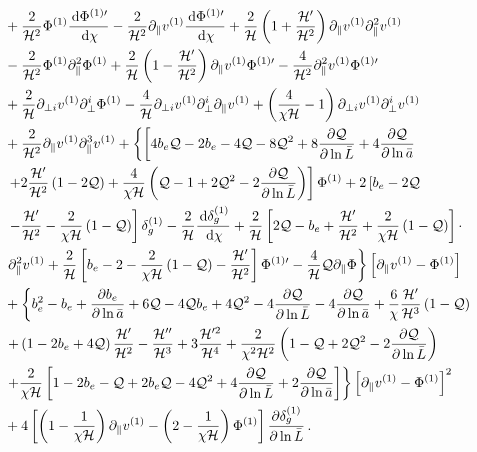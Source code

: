 \begin{align}
& + \frac{2}{\mathcal{H}^2} \Phi^{(1)} \frac{\,\mathrm{d} \Phi^{{(1)}\prime} }{\,\mathrm{d} \chi} - \frac{2}{\mathcal{H}^2} \partial_\| v^{(1)} \frac{\,\mathrm{d} \Phi^{{(1)} \prime} }{\,\mathrm{d} \chi} + \frac{2}{\mathcal{H}} \left(1 +\frac{\mathcal{H}'}{\mathcal{H}^2} \right) \partial_\| v^{(1)} \partial_\|^2 v^{(1)} \nonumber \\
& - \frac{2}{\mathcal{H}^2} \Phi^{(1)} \partial_\|^2 \Phi^{(1)} +\frac{2}{\mathcal{H}} \left(1 - \frac{\mathcal{H}'}{\mathcal{H}^2} \right) \partial_\| v^{(1)}\Phi^{(1)\prime} - \frac{4}{\mathcal{H}^2} \partial_\|^2 v^{(1)} \Phi^{(1)\prime} \nonumber \\
& + \frac{2}{\mathcal{H}} \partial_{\perp i} v^{(1)} \partial^i_\perp \Phi^{(1)} -\frac{{4}}{\mathcal{H}} \partial_{\perp i} v^{(1)} \partial_{\perp}^i \partial_\| v^{(1)} + \left(\frac{4}{ \chi \mathcal{H} } -1 \right) \partial_{\perp i} v^{(1)} \partial_{\perp}^i v^{(1)} \nonumber \\
& + \frac{2}{\mathcal{H}^2} \partial_\| v^{(1)} \partial_\|^3 v^{(1)} + \left\{ \left[ 4 b_e \mathcal{Q} - 2 b_e - 4 \mathcal{Q} - 8 \mathcal{Q}^2 + 8 \frac{\partial \mathcal{Q}}{\partial \ln \bar L} + 4 \frac{\partial \mathcal{Q}}{\partial \ln \bar a} \right. \right. \nonumber \\
&\left. \left. + 2  \frac{\mathcal{H}'}{\mathcal{H}^2} \left(1 - {2\mathcal{Q}}\right)  + \frac{4}{\chi \mathcal{H}} \left(\mathcal{Q} - 1 + 2 \mathcal{Q}^2 - 2 \frac{\partial \mathcal{Q}}{\partial \ln \bar L} \right) \right] \Phi^{(1)} + 2 \left[ b_e - 2\mathcal{Q} \right. \right. \nonumber \\
& \left. \left. -  \frac{\mathcal{H}'}{\mathcal{H}^2}  - \frac{2}{\chi \mathcal{H}} \left(1 - \mathcal{Q}\right)  \right] \delta_g^{(1)} - \frac{2}{\mathcal{H}} \frac{\,\mathrm{d} \delta_g^{(1)} }{\,\mathrm{d} \chi} + \frac{2}{\mathcal{H}} \left[ 2 \mathcal{Q} - b_e + \frac{\mathcal{H}'}{\mathcal{H}^2} + \frac{2}{\chi \mathcal{H}} \left(1 - \mathcal{Q}\right) \right]\cdot \right. \nonumber \\
&\left. \partial_\|^2 v^{(1)} + \frac{2}{\mathcal{H}} \left[ b_e - 2 - \frac{2}{\chi \mathcal{H}} \left(1 - \mathcal{Q} \right) - \frac{\mathcal{H}'}{\mathcal{H}^2} \right]  \Phi^{(1)\prime} - \frac{4}{\mathcal{H}} \mathcal{Q} \partial_\| \Phi \right\} \left[\partial_\| v^{(1)}- \Phi^{(1)} \right] \nonumber \\
& + \left\{ b_e^2 - b_e + \frac{\partial b_e}{\partial \ln \bar a} +6 \mathcal{Q} -4 \mathcal{Q} b_e + 4 \mathcal{Q}^2 - 4\frac{\partial \mathcal{Q}}{\partial \ln \bar L} - 4 \frac{\partial \mathcal{Q}}{\partial \ln \bar a} + \frac{6}{\chi} \frac{\mathcal{H}'}{\mathcal{H}^3} \left(1 - \mathcal{Q}\right) \right. \nonumber \\
& \left. + \left(1 - 2 b_e + 4\mathcal{Q} \right) \frac{\mathcal{H}' }{\mathcal{H}^2}  -\frac{\mathcal{H}'' }{\mathcal{H}^3} +3 \frac{\mathcal{H}^{\prime 2} }{\mathcal{H}^4} +  \frac{2}{\chi^2 \mathcal{H}^2} \left( 1 - \mathcal{Q} + 2 \mathcal{Q}^2 - 2 \frac{\partial \mathcal{Q}}{\partial \ln \bar L} \right) \right. \nonumber \\
& \left. + \frac{2}{\chi \mathcal{H}} \left[ 1 - 2 b_e - \mathcal{Q} + 2 b_e \mathcal{Q}  - 4 \mathcal{Q}^2 + 4 \frac{\partial \mathcal{Q}}{\partial \ln \bar L} + 2 \frac{\partial \mathcal{Q}}{\partial \ln \bar a} \right] \right\} \left[\partial_\| v^{(1)} - \Phi^{(1)}  \right]^2 \nonumber \\
&+ 4\left[ \left( 1 - \frac{1}{\chi \mathcal{H}} \right) \partial_\parallel v^{(1)} - \left(2 - \frac{1}{\chi \mathcal{H}} \right) \Phi^{(1)} \right] \frac{\partial \delta_g^{(1)}}{\partial \ln{\bar{L}}}\, .\label{eq:fulldeltaso}
\end{align}

